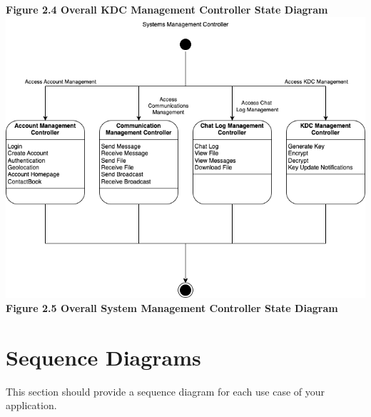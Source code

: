 \documentclass[]{article}
\begin{document}
\begin{center}
	\textbf{Figure 2.4 Overall KDC Management Controller State Diagram}
	\includegraphics[width=\textwidth]{../images/ControllerStateDiagrams/SystemController.png}
	\textbf{Figure 2.5 Overall System Management Controller State Diagram}
\end{center}

\section{Sequence Diagrams}
\label{sec:sequence_diagrams}
This section should provide a sequence diagram for each use case of your application.
\newpage
\end{document}
